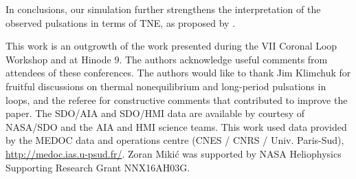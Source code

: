 \documentclass[preprint2]{aastex6}
\begin{document}
In conclusions, our simulation further strengthens the interpretation of the observed pulsations in terms of TNE, as proposed by \citet{froment2015}.
 
\acknowledgements
This work is an outgrowth of the work presented during the VII Coronal Loop Workshop and at Hinode 9. The authors acknowledge useful comments from attendees of these conferences. The authors would like to thank Jim Klimchuk for fruitful discussions on thermal nonequilibrium and long-period pulsations in loops, and the referee for constructive comments that contributed to improve the paper. The SDO/AIA and SDO/HMI data are available by courtesy of NASA/SDO and the AIA and HMI science teams. This work used data provided by the MEDOC data and operations centre (CNES / CNRS / Univ. Paris-Sud), \url{http://medoc.ias.u-psud.fr/}. Zoran Miki\'c was supported by NASA Heliophysics Supporting Research Grant NNX16AH03G.
     
                       

\end{document}
